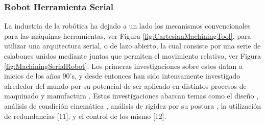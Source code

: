 \subsubsection{Robot Herramienta Serial}

La industria de la robótica ha dejado a un lado los mecanismos convencionales para las máquinas herramientas, ver Figura \ref{fig:CartesianMachiningTool}, para utilizar una arquitectura serial, o de lazo abierto,  la cual consiste por una serie de eslabones unidos mediante juntas que permiten el movimiento relativo, ver Figura \ref{fig:MachiningSerialRobot}. Los primeras investigaciones sobre estos datan a inicios de los años 90’s, y desde entonces han sido intensamente investigado alrededor del mundo por su potencial de ser aplicado en distintos procesos de maquinado y manufactura \citep{chen2013robot}. Estas investigaciones abarcan temas como el diseño \citep{denkena2017design}, análisis de condición cinemática \citep{zargarbashi2012jacobian}, análisis de rigidez por su postura \citep{guo2015stiffness}, la utilización de redundancias [11], y el control de los mismo [12].

